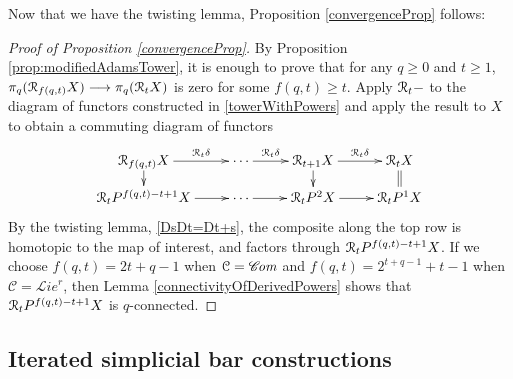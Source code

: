 \documentclass[11pt]{amsart} \renewcommand{\baselinestretch}{1.2}
\theoremstyle{plain}
\numberwithin{equation}{section} %
\theoremstyle{plain}
\numberwithin{equation}{chapter} %
\newcommand{\DASH}{\mathrm{-}}
\renewcommand{\to}{\longrightarrow}
\newcommand{\scrL}{\mathscr{L}}
\newcommand{\scrC}{\mathscr{C}}
\newcommand{\calR}{\mathcal{R}}
\newcommand{\calc}{\mathcal{C}}
\newcommand{\algs}{{\scrC\!\textit{\normalfont\textit{om}}}}
\newcommand{\restliealgs}{{\scrL\!\textit{ie}^\textit{r}}}
\newcommand{\algcat}{{\calc}}%
\newcommand{\caldup}[1]{\calR_{\smash{#1}}}
\newcommand{\SubsectionOrSection}[1]{\subsection{#1}}
\begin{document}
\begin{Bousfield-Kan spectral sequence}
Now that we have the twisting lemma, Proposition \ref{convergenceProp} follows:
\begin{proof}[Proof of Proposition \ref{convergenceProp}]
By Proposition \ref{prop:modifiedAdamsTower}, it is enough to prove that for any $q\geq0$ and $t\geq1$, $\pi_q(\caldup{f(q,t)}X)\to\pi_q(\caldup{t}X)$ is zero for some $f(q,t)\geq t$.
Apply $\caldup{t}\DASH$ to the diagram of functors constructed in \ref{towerWithPowers} and apply the result to $X$ to obtain a commuting diagram of functors
\[\xymatrix@R=4mm{
\caldup{f(q,t)}X
\ar[r]^-{\caldup{t}\delta}
\ar[d]
&
\cdots \ar[r]^-{\caldup{t}\delta}
&%
\caldup{t+1}X
\ar[r]^-{\caldup{t}\delta}
\ar[d]&%
\caldup{t}X
\ar@{=}[d]
\\%
\caldup{t}P^{f(q,t)-t+1}X
\ar[r]
&%
\cdots 
\ar[r]&%
\caldup{t}P^2X
\ar[r]
&%
\caldup{t}P^1X%
}\]
By the twisting lemma, \ref{DsDt=Dt+s}, the composite along the top row is homotopic to the map of interest, and factors through $\caldup{t}P^{f(q,t)-t+1}X$. If we choose $f(q,t)=2t+q-1$ when $\algcat=\algs$ and $f(q,t)=2^{t+q-1}+t-1$ when $\algcat=\restliealgs$, then Lemma \ref{connectivityOfDerivedPowers} shows that $\caldup{t}P^{f(q,t)-t+1}X$  is $q$-connected.
\end{proof}

\SubsectionOrSection{Iterated simplicial bar constructions}\label{sec:ItSimpBar}



\end{Bousfield-Kan spectral sequence}
\end{document}
